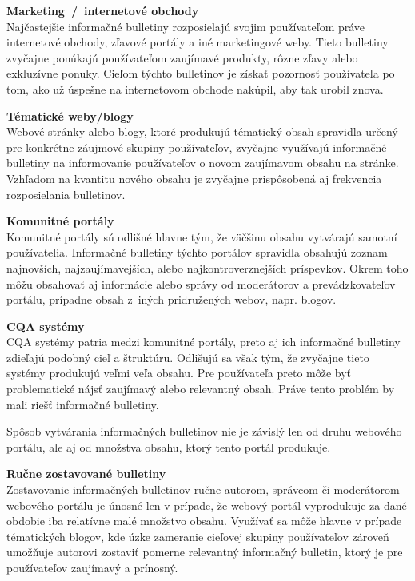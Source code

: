 \begin{my_itemize}
  \item{\textbf{Marketing~/~internetové obchody}\\
        Najčastejšie informačné bulletiny rozposielajú svojim používateľom
        práve internetové obchody, zľavové portály a iné marketingové weby. Tieto bulletiny zvyčajne ponúkajú používateľom
        zaujímavé produkty, rôzne zľavy alebo exkluzívne ponuky. Cieľom týchto bulletinov je získať pozornosť používateľa
        po tom, ako už úspešne na internetovom obchode nakúpil, aby tak urobil znova.}
  \item{\textbf{Tématické weby/blogy}\\
        Webové stránky alebo blogy, ktoré produkujú tématický obsah spravidla určený pre konkrétne záujmové skupiny používateľov,
        zvyčajne využívajú informačné bulletiny na informovanie používateľov o novom zaujímavom obsahu na stránke.
        Vzhľadom na kvantitu nového obsahu je zvyčajne prispôsobená aj frekvencia rozposielania bulletinov.}
  \item{\textbf{Komunitné portály}\\
        Komunitné portály sú odlišné hlavne tým, že väčšinu obsahu vytvárajú samotní používatelia. Informačné
        bulletiny týchto portálov spravidla obsahujú zoznam najnovších, najzaujímavejších, alebo najkontroverznejších
        príspevkov. Okrem toho môžu obsahovať aj informácie alebo správy od moderátorov a prevádzkovateľov portálu, prípadne
        obsah z~iných pridružených webov, napr. blogov.}
  \item{\textbf{CQA systémy}\\
        CQA systémy patria medzi komunitné portály, preto aj ich informačné bulletiny zdieľajú podobný cieľ a štruktúru.
        Odlišujú sa však tým, že zvyčajne tieto systémy produkujú veľmi veľa obsahu. Pre používateľa preto môže byť
        problematické nájsť zaujímavý alebo relevantný obsah. Práve tento problém by mali riešť informačné bulletiny.}
\end{my_itemize}


Spôsob vytvárania informačných bulletinov nie je závislý len od druhu webového portálu, ale aj od množstva obsahu, ktorý
tento portál produkuje.

\textbf{Ručne zostavované bulletiny}\\
Zostavovanie informačných bulletinov ručne autorom, správcom či moderátorom webového portálu je únosné len v prípade, že
webový portál vyprodukuje za dané obdobie iba relatívne malé množstvo obsahu. Využívať sa môže hlavne v prípade tématických
blogov, kde úzke zameranie cieľovej skupiny používateľov zároveň umožňuje autorovi zostaviť pomerne relevantný informačný
bulletin, ktorý je pre používateľov zaujímavý a prínosný.

